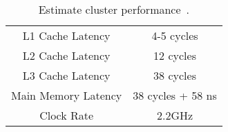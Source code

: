 \begin{table}
	\centering
	\begin{tabular}{cc}
		L1 Cache Latency & 4-5 cycles \\
		L2 Cache Latency & 12 cycles \\
		L3 Cache Latency & 38 cycles \\
		Main Memory Latency & 38 cycles + 58 ns \\
		Clock Rate & 2.2GHz \\
	\end{tabular}
	\caption{Estimate cluster performance~\cite{7cpu:-:Bradwell}.}
	\label{tab:models-baseLatencies}
\end{table}